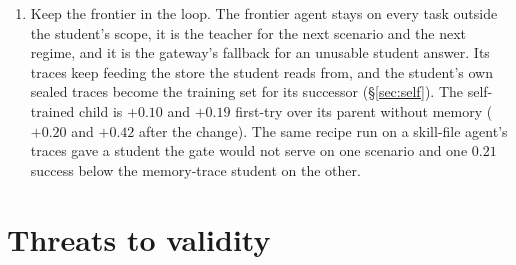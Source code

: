\documentclass[11pt]{article}
\newcommand{\cond}[1]{\textsf{#1}}
\begin{document}
\begin{enumerate}[leftmargin=1.8em, itemsep=0.3em]
  (\S\ref{sec:novel}), is the cost of switching it off. Serve the outcome record too, since
  context alone leaves most of that on the table (\cond{S1}$-$\cond{S1p}).
  \cond{S1} over \cond{S0} is $+0.26$ first-try after the trained-on
change and $+0.25$ after the novel one; \cond{S1} over \cond{S1p} is $+0.24$ under both.
\item Keep the frontier in the loop. The frontier agent stays on every task outside the
  student's scope, it is the teacher for the next scenario and the next regime, and it is the
  gateway's fallback for an unusable student answer. Its traces keep feeding the store the
  student reads from, and the student's own sealed traces become the training set for its
  successor (\S\ref{sec:self}).
  The self-trained child is $+0.10$ and $+0.19$ first-try over its
parent without memory ($+0.20$ and $+0.42$ after the change). The same recipe run on a
skill-file agent's traces gave a student the gate would not serve on one scenario and one
$0.21$ success below the memory-trace student on the other.
\end{enumerate}

\section{Threats to validity}
\end{document}
